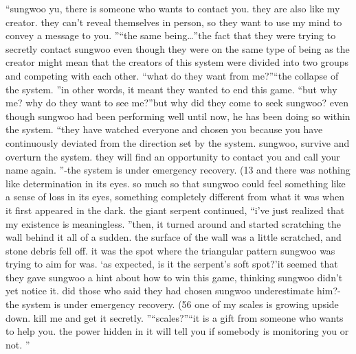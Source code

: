 “sungwoo yu, there is someone who wants to contact you.
 they are also like my creator.
 they can’t reveal themselves in person, so they want to use my mind to convey a message to you.
”“the same being…”the fact that they were trying to secretly contact sungwoo even though they were on the same type of being as the creator might mean that the creators of this system were divided into two groups and competing with each other.
“what do they want from me?”“the collapse of the system.
”in other words, it meant they wanted to end this game.
“but why me? why do they want to see me?”but why did they come to seek sungwoo? even though sungwoo had been performing well until now, he has been doing so within the system.
“they have watched everyone and chosen you because you have continuously deviated from the direction set by the system.
 sungwoo, survive and overturn the system.
 they will find an opportunity to contact you and call your name again.
”-the system is under emergency recovery.
 (13%
and there was nothing like determination in its eyes.
 so much so that sungwoo could feel something like a sense of loss in its eyes, something completely different from what it was when it first appeared in the dark.
the giant serpent continued, “i’ve just realized that my existence is meaningless.
”then, it turned around and started scratching the wall behind it all of a sudden.
the surface of the wall was a little scratched, and stone debris fell off.
it was the spot where the triangular pattern sungwoo was trying to aim for was.
‘as expected, is it the serpent’s soft spot?’it seemed that they gave sungwoo a hint about how to win this game, thinking sungwoo didn’t yet notice it.
 did those who said they had chosen sungwoo underestimate him?-the system is under emergency recovery.
 (56%
 one of my scales is growing upside down.
 kill me and get it secretly.
”“scales?”“it is a gift from someone who wants to help you.
 the power hidden in it will tell you if somebody is monitoring you or not.
”

 